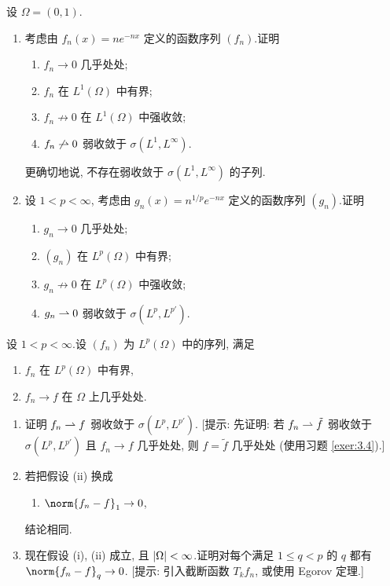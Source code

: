 \begin{exercise}
\label{exer:4.15}
设 $\Omega=(0,1)$.
\begin{enumerate}[label=\arabic*., leftmargin=2.2em, itemsep=0.35em]
	\item 考虑由 $f_n(x)=ne^{-nx}$ 定义的函数序列 $(f_n)$.证明
	      \begin{enumerate}[label=(\roman*), leftmargin=2.4em, itemsep=0.1em]
	      	\item $f_n\to0$ 几乎处处;
	      	\item $f_n$ 在 $L^1(\Omega)$ 中有界;
	      	\item $f_n\not\to0$ 在 $L^1(\Omega)$ 中强收敛;
	      	\item $f_n\not\rightharpoonup0$ 弱收敛于 $\sigma(L^1,L^\infty)$.
	      \end{enumerate}
	      更确切地说, 不存在弱收敛于 $\sigma(L^1,L^\infty)$ 的子列.
	\item 设 $1<p<\infty$, 考虑由 $g_n(x)=n^{1/p}e^{-nx}$ 定义的函数序列
	      $(g_n)$.证明
	      \begin{enumerate}[label=(\roman*), leftmargin=2.4em, itemsep=0.1em]
	      	\item $g_n\to0$ 几乎处处;
	      	\item $(g_n)$ 在 $L^p(\Omega)$ 中有界;
	      	\item $g_n\not\to0$ 在 $L^p(\Omega)$ 中强收敛;
	      	\item $g_n\rightharpoonup0$ 弱收敛于 $\sigma(L^p,L^{p'})$.
	      \end{enumerate}
\end{enumerate}
\end{exercise}

\begin{exercise}
\label{exer:4.16}
设 $1<p<\infty$.设 $(f_n)$ 为 $L^p(\Omega)$ 中的序列, 满足
\begin{enumerate}[label=(\roman*), leftmargin=2.4em, itemsep=0.1em]
	\item $f_n$ 在 $L^p(\Omega)$ 中有界,
	\item $f_n\to f$ 在 $\Omega$ 上几乎处处.
\end{enumerate}
\begin{enumerate}[label=\arabic*., leftmargin=2.2em, itemsep=0.35em]
	\item 证明 $f_n\rightharpoonup f$ 弱收敛于 $\sigma(L^p,L^{p'})$.
	      [提示: 先证明: 若 $f_n\rightharpoonup\tilde f$ 弱收敛于
	      $\sigma(L^p,L^{p'})$ 且 $f_n\to f$ 几乎处处, 则 $f=\tilde f$ 几乎处处
	      (使用习题  \ref{exer:3.4}).]
	\item 若把假设 (ii) 换成
	      \begin{enumerate}[label=(\roman*)$'$, leftmargin=3.0em, itemsep=0.1em]
	      	\item $\norm{f_n-f}_1\to0$,
	      \end{enumerate}
	      结论相同.
	\item 现在假设 (i), (ii) 成立, 且 $\left|\Omega\right|<\infty$.证明对每个满足
	      $1\le q<p$ 的 $q$ 都有 $\norm{f_n-f}_q\to0$.
	      [提示: 引入截断函数 $T_kf_n$, 或使用 Egorov 定理.]
\end{enumerate}
\end{exercise}

